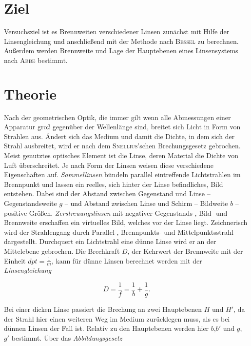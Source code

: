 \section{Ziel}
\label{sec:Ziel}

Versuchsziel ist es Brennweiten verschiedener Linsen zunächst mit Hilfe der Linsengleichung und anschließend mit der Methode nach \textsc{Bessel} zu berechnen. 
Außerdem werden Brennweite und Lage der Hauptebenen eines Linsensystems nach \textsc{Abbe} bestimmt.

\section{Theorie}
\label{sec:Theorie}

Nach der geometrischen Optik, die immer gilt wenn alle Abmessungen einer Apparatur groß gegenüber der Wellenlänge sind, breitet sich Licht in Form von Strahlen aus. 
Ändert sich das Medium und damit die Dichte, in dem sich der Strahl ausbreitet, wird er nach dem \textsc{Snellius}'schen Brechungsgesetz gebrochen. 
Meist genutztes optisches Element ist die Linse, deren Material die Dichte von Luft überschreitet. 
Je nach Form der Linsen weisen diese verschiedene Eigenschaften auf. \emph{Sammellinsen} bündeln parallel eintreffende Lichtstrahlen im Brennpunkt und lassen ein reelles, sich hinter der Linse befindliches, Bild entstehen. Dabei sind der Abstand zwischen Gegenstand und Linse -- Gegenstandsweite $g$ -- und Abstand zwischen Linse und Schirm -- Bildweite $b$ -- positive Größen. 
\emph{Zerstreuungslinsen} mit negativer Gegenstands-, Bild- und Brennweite erschaffen ein virtuelles Bild, welches vor der Linse liegt. Zeichnerisch wird der Strahlengang durch Parallel-, Brennpunkts- und Mittelpunktsstrahl dargestellt.
Durchquert ein Lichtstrahl eine dünne Linse wird er an der Mittelebene gebrochen.
Die Brechkraft $D$, der Kehrwert der Brennweite mit der Einheit $dpt=\frac{1}{m}$, kann für dünne Linsen berechnet werden mit der \emph{Linsengleichung}

\begin{equation}
	D=\frac{1}{f}=\frac{1}{b}+\frac{1}{g}.
\end{equation}

Bei einer dicken Linse passiert die Brechung an zwei Hauptebenen $H$ und $H'$, da der Strahl hier einen weiteren Weg im Medium zurücklegen muss, als es bei dünnen Linsen der Fall ist.
 Relativ zu den Hauptebenen werden hier $b$,$b'$ und $g$, $g'$ bestimmt. 
Über das \emph{Abbildungsgesetz} 

